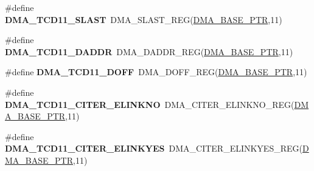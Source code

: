 \begin{DoxyCompactItemize}
\item 
\hypertarget{group___d_m_a___register___accessor___macros_gabcae252b374277bc2405a856023d0393}{}\#define {\bfseries D\+M\+A\+\_\+\+T\+C\+D11\+\_\+\+S\+L\+A\+S\+T}~D\+M\+A\+\_\+\+S\+L\+A\+S\+T\+\_\+\+R\+E\+G(\hyperlink{group___d_m_a___peripheral_ga6997fbc1b1973e9f27170217a3bd6f22}{D\+M\+A\+\_\+\+B\+A\+S\+E\+\_\+\+P\+T\+R},11)\label{group___d_m_a___register___accessor___macros_gabcae252b374277bc2405a856023d0393}

\item 
\hypertarget{group___d_m_a___register___accessor___macros_ga85eb84f9db603a9914f8083f55c8091c}{}\#define {\bfseries D\+M\+A\+\_\+\+T\+C\+D11\+\_\+\+D\+A\+D\+D\+R}~D\+M\+A\+\_\+\+D\+A\+D\+D\+R\+\_\+\+R\+E\+G(\hyperlink{group___d_m_a___peripheral_ga6997fbc1b1973e9f27170217a3bd6f22}{D\+M\+A\+\_\+\+B\+A\+S\+E\+\_\+\+P\+T\+R},11)\label{group___d_m_a___register___accessor___macros_ga85eb84f9db603a9914f8083f55c8091c}

\item 
\hypertarget{group___d_m_a___register___accessor___macros_gac5dd3f7a538782a6fd6c61bd364a60b6}{}\#define {\bfseries D\+M\+A\+\_\+\+T\+C\+D11\+\_\+\+D\+O\+F\+F}~D\+M\+A\+\_\+\+D\+O\+F\+F\+\_\+\+R\+E\+G(\hyperlink{group___d_m_a___peripheral_ga6997fbc1b1973e9f27170217a3bd6f22}{D\+M\+A\+\_\+\+B\+A\+S\+E\+\_\+\+P\+T\+R},11)\label{group___d_m_a___register___accessor___macros_gac5dd3f7a538782a6fd6c61bd364a60b6}

\item 
\hypertarget{group___d_m_a___register___accessor___macros_ga8f6d29f6217fa5d8123a5ee867cd228f}{}\#define {\bfseries D\+M\+A\+\_\+\+T\+C\+D11\+\_\+\+C\+I\+T\+E\+R\+\_\+\+E\+L\+I\+N\+K\+N\+O}~D\+M\+A\+\_\+\+C\+I\+T\+E\+R\+\_\+\+E\+L\+I\+N\+K\+N\+O\+\_\+\+R\+E\+G(\hyperlink{group___d_m_a___peripheral_ga6997fbc1b1973e9f27170217a3bd6f22}{D\+M\+A\+\_\+\+B\+A\+S\+E\+\_\+\+P\+T\+R},11)\label{group___d_m_a___register___accessor___macros_ga8f6d29f6217fa5d8123a5ee867cd228f}

\item 
\hypertarget{group___d_m_a___register___accessor___macros_ga7a1d5152d02587612df16a045070a150}{}\#define {\bfseries D\+M\+A\+\_\+\+T\+C\+D11\+\_\+\+C\+I\+T\+E\+R\+\_\+\+E\+L\+I\+N\+K\+Y\+E\+S}~D\+M\+A\+\_\+\+C\+I\+T\+E\+R\+\_\+\+E\+L\+I\+N\+K\+Y\+E\+S\+\_\+\+R\+E\+G(\hyperlink{group___d_m_a___peripheral_ga6997fbc1b1973e9f27170217a3bd6f22}{D\+M\+A\+\_\+\+B\+A\+S\+E\+\_\+\+P\+T\+R},11)\label{group___d_m_a___register___accessor___macros_ga7a1d5152d02587612df16a045070a150}


\end{DoxyCompactItemize}
